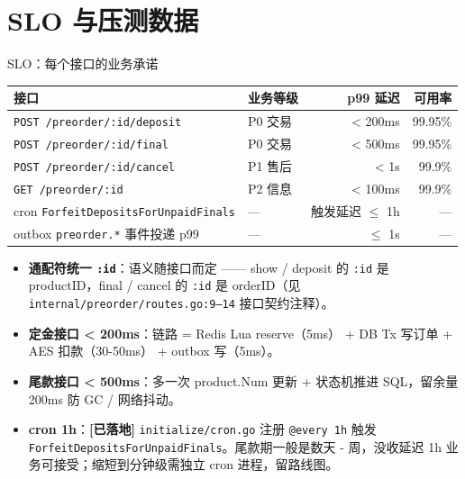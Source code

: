 \documentclass[aspectratio=169,11pt]{beamer}
\begin{document}
\section{SLO 与压测数据}

\begin{frame}[shrink]{SLO：每个接口的业务承诺}
{\footnotesize
\begin{tabular}{@{}llrr@{}}
\toprule
接口 & 业务等级 & p99 延迟 & 可用率 \\
\midrule
\texttt{POST /preorder/:id/deposit} & P0 交易 & < 200ms & 99.95\% \\
\texttt{POST /preorder/:id/final}   & P0 交易 & < 500ms & 99.95\% \\
\texttt{POST /preorder/:id/cancel}  & P1 售后 & < 1s   & 99.9\%  \\
\texttt{GET  /preorder/:id}         & P2 信息 & < 100ms & 99.9\%  \\
\midrule
cron \texttt{ForfeitDepositsForUnpaidFinals} & — & 触发延迟 $\leq$ 1h & — \\
outbox \texttt{preorder.*} 事件投递 p99 & — & $\leq$ 1s & — \\
\bottomrule
\end{tabular}}
\vspace{2mm}
\begin{itemize}\small
  \item \textbf{通配符统一 \texttt{:id}}：语义随接口而定 —— show / deposit 的 \texttt{:id} 是 productID，final / cancel 的 \texttt{:id} 是 orderID（见 \texttt{internal/preorder/routes.go:9--14} 接口契约注释）。
  \item \textbf{定金接口 < 200ms}：链路 = Redis Lua reserve（5ms） + DB Tx 写订单 + AES 扣款（30-50ms） + outbox 写（5ms）。
  \item \textbf{尾款接口 < 500ms}：多一次 product.Num 更新 + 状态机推进 SQL，留余量 200ms 防 GC / 网络抖动。
  \item \textbf{cron 1h}：\textcolor{cOK}{\textbf{[已落地]}} \texttt{initialize/cron.go} 注册 \texttt{@every 1h} 触发 \texttt{ForfeitDepositsForUnpaidFinals}。尾款期一般是数天 - 周，没收延迟 1h 业务可接受；缩短到分钟级需独立 cron 进程，留路线图。
\end{itemize}
\end{frame}
\end{document}
